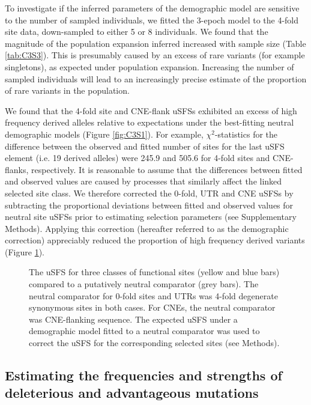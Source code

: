 	To investigate if the inferred parameters of the demographic model are sensitive to the number of sampled individuals, we fitted the 3-epoch model to the 4-fold site data, down-sampled to either 5 or 8 individuals. We found that the magnitude of the population expansion inferred increased with sample size (Table \ref{tab:C3S3}). This is presumably caused by an excess of rare variants (for example singletons), as expected under population expansion. Increasing the number of sampled individuals will lead to an increasingly precise estimate of the proportion of rare variants in the population. 

	We found that the 4-fold site and CNE-flank uSFSs exhibited an excess of high frequency derived alleles relative to expectations under the best-fitting neutral demographic models (Figure \ref{fig:C3S1}). For example, $\chi^2$-statistics for the difference between the observed and fitted number of sites for the last uSFS element (i.e. 19 derived alleles) were 245.9 and 505.6 for 4-fold sites and CNE-flanks, respectively. It is reasonable to assume that the differences between fitted and observed values are caused by processes that similarly affect the linked selected site class. We therefore corrected the 0-fold, UTR and CNE uSFSs by subtracting the proportional deviations between fitted and observed values for neutral site uSFSs prior to estimating selection parameters (see Supplementary Methods). Applying this correction (hereafter referred to as the demographic correction) appreciably reduced the proportion of high frequency derived variants (Figure \ref{fig:uSFS_data}).

 \begin{figure}[H]
   \centering      
   \noindent{}
 \caption[The uSFS for multiple classes of sites in the \textit{M. m. castaneus} genome]{The uSFS for three classes of functional sites (yellow and blue bars) compared to a putatively neutral comparator (grey bars). The neutral comparator for 0-fold sites and UTRs was 4-fold degenerate synonymous sites in both cases. For CNEs, the neutral comparator was CNE-flanking sequence. The expected uSFS under a demographic model fitted to a neutral comparator was used to correct the uSFS for the corresponding selected sites (see Methods).}
 \label{fig:uSFS_data}
\end{figure}


\subsection{Estimating the frequencies and strengths of deleterious and advantageous mutations}

